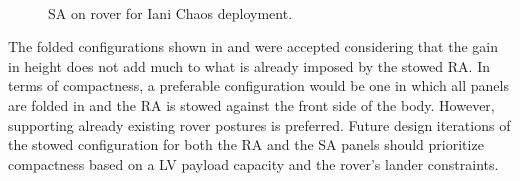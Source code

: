 \begin{figure}[h]
\begin{subfigure}[t]{\subfigureWidth}
		\label{fig:sub:solar-array-on-rover-for-iani-chaos-deployed}
	\end{subfigure}\\[0.8ex]
    \caption[Solar array on rover for Iani Chaos deployment]
            {\ac{SA} on rover for Iani Chaos deployment.}
    \label{fig:solar-array-on-rover-iani-chaos}
\vspace{-2ex}
\end{figure}

\vspace{0.5cm}

The folded configurations shown in  and  were accepted considering that the gain in height does not add much to what is already imposed by the stowed \ac{RA}. In terms of compactness, a preferable configuration would be one in which all panels are folded in and the \ac{RA} is stowed against the front side of the body. However, supporting already existing rover postures is preferred. Future design iterations of the stowed configuration for both the \ac{RA} and the \ac{SA} panels should prioritize compactness based on a \ac{LV} payload capacity and the rover's lander constraints.

\vspace{0.5cm}

